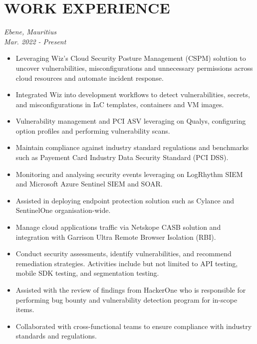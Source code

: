 \documentclass[a4paper, fleqn, oneside]{article}
\begin{document}
\section{WORK EXPERIENCE}
\label{sec:org2935aaa}
{ \hfill \textit{Ebene, Mauritius}} \\
{ \hfill {\textit{Mar. 2022 - Present}}}
\begin{itemize}
\item Leveraging Wiz's Cloud Security Posture Management (CSPM) solution to uncover vulnerabilities, misconfigurations and unnecessary permissions across cloud resources and automate incident response.
\item Integrated Wiz into development workflows to detect vulnerabilities, secrets, and misconfigurations in IaC templates, containers and VM images.
\item Vulnerability management and PCI ASV leveraging on Qualys, configuring option profiles and performing vulnerability scans.
\item Maintain compliance against industry standard regulations and benchmarks such as Payement Card Industry Data Security Standard (PCI DSS).
\item Monitoring and analysing security events leveraging on LogRhythm SIEM and Microsoft Azure Sentinel SIEM and SOAR.
\item Assisted in deploying endpoint protection solution such as Cylance and SentinelOne organisation-wide.
\item Manage cloud applications traffic via Netskope CASB solution and integration with Garrison Ultra Remote Browser Isolation (RBI).
\item Conduct security assessments, identify vulnerabilities, and recommend remediation strategies. Activities include but not limited to API testing, mobile SDK testing, and segmentation testing.
\item Assisted with the review of findings from HackerOne who is responsible for performing bug bounty and vulnerability detection program for in-scope items.
\item Collaborated with cross-functional teams to ensure compliance with industry standards and regulations.
\end{itemize}
\end{document}
